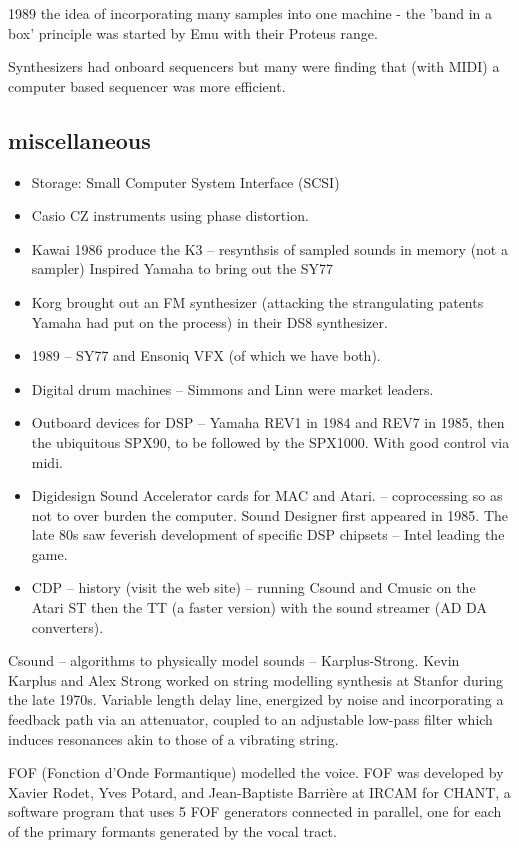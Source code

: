 1989 the idea of incorporating many samples into one machine - the 'band in a box' principle was started by Emu with their Proteus range.

Synthesizers had onboard sequencers but many were finding that (with MIDI) a computer based sequencer was more efficient.  

\subsection{miscellaneous}
\begin{itemize}
\item Storage: Small Computer System Interface (SCSI)
\item Casio CZ instruments using phase distortion.
\item Kawai 1986 produce the K3 – resynthsis of sampled sounds in memory (not a sampler) Inspired Yamaha to bring out the SY77
\item Korg brought out an FM synthesizer (attacking the strangulating patents Yamaha had put on the process) in their DS8 synthesizer. 
\item 1989 – SY77 and Ensoniq VFX (of which we have both).
\item Digital drum machines – Simmons and Linn were market leaders.
\item Outboard devices for DSP – Yamaha REV1 in 1984 and REV7 in 1985, then the ubiquitous SPX90, to be followed by the SPX1000. With good control via midi.
\item Digidesign Sound Accelerator cards for MAC and Atari. – coprocessing so as not to over burden the computer. Sound Designer first appeared in 1985.  The late 80s saw feverish development of specific DSP chipsets – Intel leading the game.
\item CDP – history (visit the web site) – running Csound and Cmusic on the Atari ST then the TT (a faster version) with the sound streamer (AD DA converters). 
\end{itemize}

Csound – algorithms to physically model sounds – Karplus-Strong. Kevin Karplus and Alex Strong worked on string modelling synthesis at Stanfor during the late 1970s.  Variable length delay line, energized by noise and incorporating a feedback path via an attenuator, coupled to an adjustable low-pass filter which induces resonances akin to those of a vibrating string. 

FOF (Fonction d’Onde Formantique) modelled the voice.  FOF was developed by Xavier Rodet, Yves Potard, and Jean-Baptiste Barrière at IRCAM for CHANT, a software program that uses 5 FOF generators connected in parallel, one for each of the primary formants generated by the vocal tract.  

